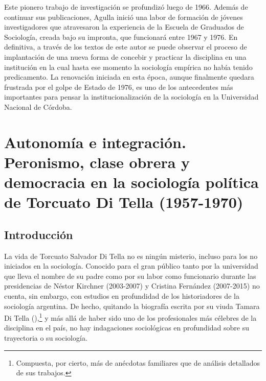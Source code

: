 Este pionero trabajo de investigación se profundizó luego de 1966. Además de continuar sus publicaciones, Agulla inició una labor de formación de jóvenes investigadores que atravesaron la experiencia de la Escuela de Graduados de Sociología, creada bajo su impronta, que funcionará entre 1967 y 1976. En definitiva, a través de los textos de este autor se puede observar el proceso de implantación de una nueva forma de concebir y practicar la disciplina en una institución en la cual hasta ese momento la sociología empírica no había tenido predicamento. La renovación iniciada en esta época, aunque finalmente quedara frustrada por el golpe de Estado de 1976, es uno de los antecedentes más importantes para pensar la institucionalización de la sociología en la Universidad Nacional de Córdoba.

\chapter[Autonomía e integración. Peronismo, clase obrera y democracia en la sociología política de Torcuato Di Tella (1957-1970)]{Autonomía e integración. Peronismo, clase obrera y democracia en la sociología política de Torcuato Di Tella (1957-1970)}

\section{Introducción}

La vida de Torcuato Salvador Di Tella no es ningún misterio, incluso para los no iniciados en la sociología. Conocido para el gran público tanto por la universidad que lleva el nombre de su padre como por su labor como funcionario durante las presidencias de Néstor Kirchner (2003-2007) y Cristina Fernández (2007-2015) no cuenta, sin embargo, con estudios en profundidad de los historiadores de la sociología argentina. De hecho, quitando la biografía escrita por su viuda Tamara Di Tella (\citeyear{1648-DITELLA2019}),\footnote{Compuesta, por cierto, más de anécdotas familiares que de análisis detallados de sus trabajos.} y más allá de haber sido uno de los profesionales más célebres de la disciplina en el país, no hay indagaciones sociológicas en profundidad sobre su trayectoria o su sociología.

